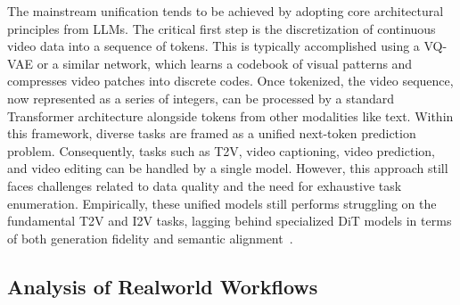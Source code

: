 \documentclass{article}
\begin{document}
The mainstream unification tends to be achieved by adopting core architectural principles from LLMs. The critical first step is the discretization of continuous video data into a sequence of tokens. This is typically accomplished using a VQ-VAE or a similar network, which learns a codebook of visual patterns and compresses video patches into discrete codes. Once tokenized, the video sequence, now represented as a series of integers, can be processed by a standard Transformer architecture alongside tokens from other modalities like text. Within this framework, diverse tasks are framed as a unified next-token prediction problem. Consequently, tasks such as T2V, video captioning, video prediction, and video editing can be handled by a single model. However, this approach still faces challenges related to data quality and the need for exhaustive task enumeration. Empirically, these unified models still performs struggling on the fundamental T2V and I2V tasks, lagging behind specialized DiT models in terms of both generation fidelity and semantic alignment~\citep{huang2024vbench,ghosh2023geneval}.



\subsection{Analysis of Realworld Workflows}
\end{document}
